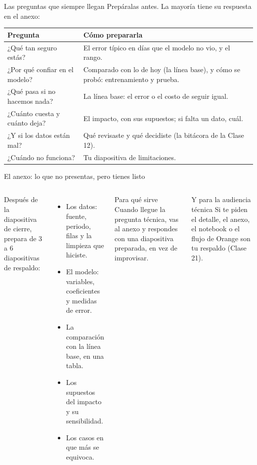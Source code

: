 \documentclass[aspectratio=169,11pt]{beamer}
\begin{document}
\begin{frame}[t]{Las preguntas que siempre llegan}
  \small Prepáralas antes. La mayoría tiene su respuesta en el anexo:
  \vspace{0.1cm}

  \footnotesize
  \renewcommand{\arraystretch}{1.3}
  \begin{tabular}{@{}L{4.0cm}L{9.5cm}@{}}
    \toprule
    \textbf{Pregunta} & \textbf{Cómo prepararla} \\
    \midrule
    ¿Qué tan seguro estás? & El error típico en días que el modelo no vio, y el rango. \\
    ¿Por qué confiar en el modelo? & Comparado con lo de hoy (la línea base), y cómo se probó: entrenamiento y prueba. \\
    ¿Qué pasa si no hacemos nada? & La línea base: el error o el costo de seguir igual. \\
    ¿Cuánto cuesta y cuánto deja? & El impacto, con sus supuestos; si falta un dato, cuál. \\
    ¿Y si los datos están mal? & Qué revisaste y qué decidiste (la bitácora de la Clase 12). \\
    ¿Cuándo no funciona? & Tu diapositiva de limitaciones. \\
    \bottomrule
  \end{tabular}
\end{frame}

\begin{frame}[t]{El anexo: lo que no presentas, pero tienes listo}
  \begin{columns}[T,onlytextwidth]
    \small Después de la diapositiva de cierre, prepara de 3 a 6
    diapositivas de respaldo:
    \begin{itemize}
      \footnotesize
      \item Los datos: fuente, periodo, filas y la limpieza que hiciste.
      \item El modelo: variables, coeficientes y medidas de error.
      \item La comparación con la línea base, en una tabla.
      \item Los supuestos del impacto y su sensibilidad.
      \item Los casos en que más se equivoca.
    \end{itemize}
    \begin{exampleblock}{Para qué sirve}
      \footnotesize Cuando llegue la pregunta técnica, vas al anexo y
      respondes con una diapositiva preparada, en vez de improvisar.
    \end{exampleblock}
    \begin{block}{Y para la audiencia técnica}
      \footnotesize Si te piden el detalle, el anexo, el notebook o el flujo
      de Orange son tu respaldo (Clase 21).
    \end{block}
  \end{columns}
\end{frame}
\end{document}
